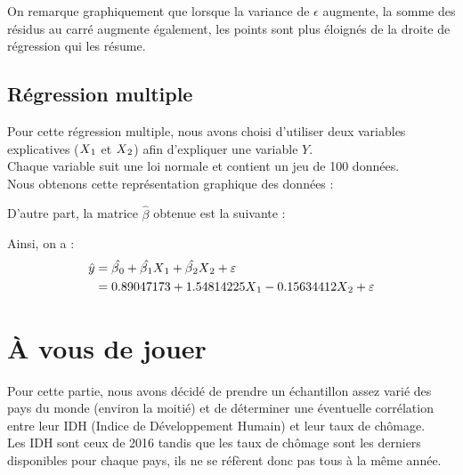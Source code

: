 \documentclass[paper=a4, fontsize=11pt]{scrartcl} %
\numberwithin{equation}{section} %
\numberwithin{figure}{section} %
\numberwithin{table}{section} %
\begin{document}
On remarque graphiquement que lorsque la variance de $\epsilon$ augmente, la somme des résidus au carré augmente également, les points sont plus éloignés de la droite de régression qui les résume.

\newpage
\subsection{Régression multiple}
Pour cette régression multiple, nous avons choisi d'utiliser deux variables explicatives ($X\textsubscript{1}$ et $X\textsubscript{2}$) afin d'expliquer une variable $Y$.\\
Chaque variable suit une loi normale et contient un jeu de 100 données.\\
Nous obtenons cette représentation graphique des données :
\begin{center}
\end{center}
\begin{center}
\end{center}

D'autre part, la matrice $\hat{\beta}$ obtenue est la suivante :
\begin{center}
\end{center}
Ainsi, on a :
\begin{align} 
	\begin{split}
	\hat{y} &= \hat{\beta\textsubscript{0}} + \hat{\beta\textsubscript{1}}X\textsubscript{1} + \hat{\beta\textsubscript{2}}X\textsubscript{2} + \varepsilon \\
	&= 0.89047173 + 1.54814225X\textsubscript{1} - 0.15634412X\textsubscript{2} + \varepsilon \\
	\end{split}					
	\end{align}

\newpage
\section{À vous de jouer}
Pour cette partie, nous avons décidé de prendre un échantillon assez varié des pays du monde (environ la moitié) et de déterminer une éventuelle corrélation entre leur IDH (Indice de Développement Humain) et leur taux de chômage.\\
Les IDH sont ceux de 2016 tandis que les taux de chômage sont les derniers disponibles pour chaque pays, ils ne se réfèrent donc pas tous à la même année.
\end{document}
